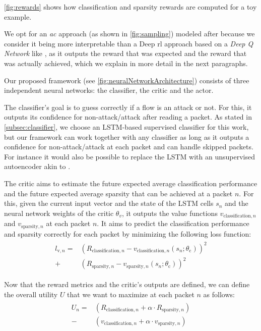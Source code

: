 \documentclass[conference]{IEEEtran}
\begin{document}
\autoref{fig:rewards} shows how classification and sparsity rewards are computed for a toy example.

We opt for an \emph{\gls{ac}} approach (as shown in \autoref{fig:sampling}) modeled after \cite{mnih_asynchronous_2016} because we consider it being more interpretable than a Deep \gls{rl} approach based on a \textit{Deep Q Network} like \cite{mnih_playing_2013}, as it outputs the reward that was expected and the reward that was actually achieved, which we explain in more detail in the next paragraphs.

Our proposed framework (see \autoref{fig:neuralNetworkArchitecture}) consists of three independent neural networks: the classifier, the critic and the actor.

The classifier's goal is to guess correctly if a flow is an attack or not. For this, it outputs its confidence for non-attack/attack after reading a packet. As stated in \autoref{subsec:classifier}, we choose an LSTM-based supervised classifier for this work, but our framework can work together with any classifier as long as it outputs a confidence for non-attack/attack at each packet and can handle skipped packets. For instance it would also be possible to replace the LSTM with an unsupervised autoencoder akin to \cite{mirsky_kitsune_2018}.

The critic aims to estimate the future expected average classification performance and the future expected average sparsity that can be achieved at a packet $n$. For this, given the current input vector and the state of the LSTM cells $s_n$ and the neural network weights of the critic $\theta_v$, it outputs the value functions $v_{\text{classification},n}$ and $v_{\text{sparsity},n}$ at each packet $n$. It aims to predict the classification performance and sparsity correctly for each packet by minimizing the following loss function:
\begin{align}
\begin{split}
l_{\text{v},n} =& \left(R_{\text{classification},n} - v_{\text{classification},n}\left(s_n ; \theta_\text{c} \right)\right)^2 \\
+ & \left(R_{\text{sparsity},n} - v_{\text{sparsity},n}\left(s_n ; \theta_\text{c} \right)\right)^2
\end{split}
\end{align}

Now that the reward metrics and the critic's outputs are defined, we can define the overall utility $U$ that we want to maximize at each packet $n$ as follows:
\begin{align}
\begin{split}
U_n =& \left(R_{\text{classification},n} + \alpha \cdot R_{\text{sparsity},n}\right) \\
- & \left(v_{\text{classification},n} + \alpha \cdot v_{\text{sparsity},n}\right)
\end{split}
\end{align}
\end{document}
